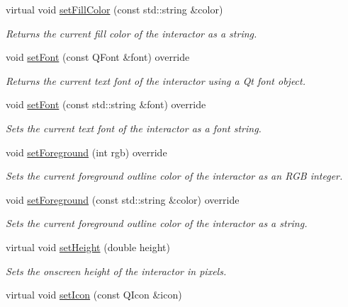 \begin{DoxyCompactItemize}
virtual void \mbox{\hyperlink{classsgl_1_1GDrawingSurface_adbc18b1a930aadd97d7437f9f7265b96}{set\+Fill\+Color}} (const std\+::string \&color)
\begin{DoxyCompactList}\small\item\em Returns the current fill color of the interactor as a string. \end{DoxyCompactList}\item 
void \mbox{\hyperlink{classsgl_1_1GCanvas_ad1d75b3840a41ba7d1e8a921696dc684}{set\+Font}} (const Q\+Font \&font) override
\begin{DoxyCompactList}\small\item\em Returns the current text font of the interactor using a Qt font object. \end{DoxyCompactList}\item 
void \mbox{\hyperlink{classsgl_1_1GCanvas_a51367c9fd2709973b1f7238734f93891}{set\+Font}} (const std\+::string \&font) override
\begin{DoxyCompactList}\small\item\em Sets the current text font of the interactor as a font string. \end{DoxyCompactList}\item 
void \mbox{\hyperlink{classsgl_1_1GCanvas_a59f7cd2bd1708c12dfa52a8f7c7b79c9}{set\+Foreground}} (int rgb) override
\begin{DoxyCompactList}\small\item\em Sets the current foreground outline color of the interactor as an R\+GB integer. \end{DoxyCompactList}\item 
void \mbox{\hyperlink{classsgl_1_1GCanvas_a8afbcf1f47750fb4c717f9ff36540235}{set\+Foreground}} (const std\+::string \&color) override
\begin{DoxyCompactList}\small\item\em Sets the current foreground outline color of the interactor as a string. \end{DoxyCompactList}\item 
virtual void \mbox{\hyperlink{classsgl_1_1GInteractor_a9e280bfc4544dfaf8e4376c4e1a74357}{set\+Height}} (double height)
\begin{DoxyCompactList}\small\item\em Sets the onscreen height of the interactor in pixels. \end{DoxyCompactList}\item 
virtual void \mbox{\hyperlink{classsgl_1_1GInteractor_a542abfcd7261751352af129c7215ecda}{set\+Icon}} (const Q\+Icon \&icon)

\end{DoxyCompactItemize}
